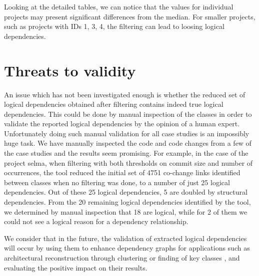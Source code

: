 \documentclass[a4paper,twoside]{article}
\begin{document}
Looking at the detailed tables, we can notice that the values for individual projects may present significant differences from the median. For smaller projects, such as projects with IDs 1, 3, 4, the filtering can lead to loosing logical dependencies.  


\section {Threats to validity}
\label{sec:validity}


An issue which has not been investigated enough is whether the reduced set of logical dependencies obtained after filtering contains indeed true logical dependencies. This could be done by manual inspection of the classes in order to validate the reported logical dependencies by the opinion of a human expert. Unfortunately doing such manual validation for all case studies is an impossibly huge task. We have manually inspected the code and code changes from a few of the case studies and the results seem promising. For example, in the case of the project selma, when filtering with both thresholds on commit size and number of occurrences, the tool reduced the initial set of 4751 co-change links identified between classes when no filtering was done, to a number of just 25 logical dependencies. Out of these 25 logical dependencies, 5 are doubled by structural dependencies. From the 20 remaining logical dependencies identified by the tool, we determined by manual inspection that 18 are logical, while for 2 of them we could not see a logical reason for a dependency relationship. 

We consider that in the future, the validation of extracted logical dependencies will occur by using them to enhance dependency graphs for  applications such as architectural reconstruction through clustering \cite{SoraConti} or finding of key classes \cite{PagerankENASE}, and evaluating the positive impact on their results.   
\end{document}

